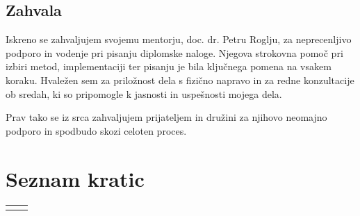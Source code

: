 \documentclass[12pt,a4paper,titlepage,openany]{report}
\begin{document}

\newpage
\section*{Zahvala}
Iskreno se zahvaljujem svojemu mentorju, doc. dr. Petru Roglju, za neprecenljivo podporo in vodenje pri pisanju diplomske naloge. Njegova strokovna pomoč pri izbiri metod, implementaciji ter pisanju je bila ključnega pomena na vsakem koraku. Hvaležen sem za priložnost dela s fizično napravo in za redne konzultacije ob sredah, ki so pripomogle k jasnosti in uspešnosti mojega dela.

Prav tako se iz srca zahvaljujem prijateljem in družini za njihovo neomajno podporo in spodbudo skozi celoten proces.

\newpage

\tableofcontents
{}
\newpage
\listoftables
{}
\newpage
\listoffigures
{}
\newpage


\chapter*{Seznam kratic}
\thispagestyle{fancyplain}
\begin{longtable}{@{}p{2cm}@{}p{\dimexpr\textwidth-2cm\relax}@{}}

\nomenclature{$EEG$}{elektroencefalografija}
\nomenclature{$MMID$}{Motor Movement/Imagery Dataset} 
\nomenclature{$PLI$}{phase lag index}
\nomenclature{$wPLI$}{weighted phase lag index}
\nomenclature{$k-NN$}{k nearest neighbours}
\nomenclature{$SVM$}{support vector machine}
\nomenclature{$CPCC$}{complex Pearson correlation coefficient}
\nomenclature{$GC$}{Granger causality}

\end{longtable}
\newpage

\normalsize


% 
% 









\printbibliography

\end{document}
